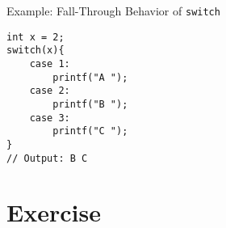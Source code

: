 \documentclass[12pt, aspectratio=169]{beamer}
\begin{document}
    \begin{frame}[fragile]{Example: Fall-Through Behavior of \texttt{switch}}
        \begin{verbatim}
int x = 2;
switch(x){
    case 1: 
        printf("A ");
    case 2: 
        printf("B ");
    case 3: 
        printf("C ");
}
// Output: B C
        \end{verbatim}
    \end{frame}




    \section{Exercise}
\end{document}
